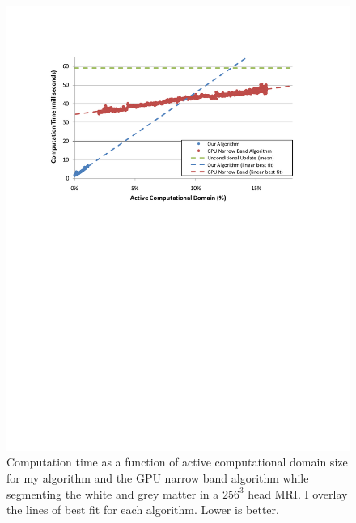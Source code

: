 \begin{figure}[t]
\centering
\includegraphics[width=6.0in]{figures/SpeedC1.pdf}
\caption{Computation time as a function of active computational domain size for my algorithm and the GPU narrow band algorithm while segmenting the white and grey matter in a $256^3$ head MRI. I overlay the lines of best fit for each algorithm. Lower is better.}
\label{fig:speedperactive}
\end{figure}

